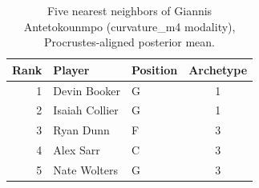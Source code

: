 \begin{table}[htbp]
  \centering\small
  \begin{tabular}{rllc}
    \toprule
    Rank & Player & Position & Archetype \\
    \midrule
    1 & Devin Booker & G & 1 \\
    2 & Isaiah Collier & G & 1 \\
    3 & Ryan Dunn & F & 3 \\
    4 & Alex Sarr & C & 3 \\
    5 & Nate Wolters & G & 3 \\
    \bottomrule
  \end{tabular}
  \caption{Five nearest neighbors of Giannis Antetokounmpo (curvature_m4 modality), Procrustes-aligned posterior mean.}
  \label{tab:Giannis_Antetokounmpo_neighbors_curvature_m4}
\end{table}

